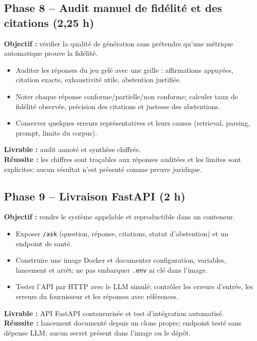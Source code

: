 \documentclass[11pt,a4paper]{article}
\begin{document}
\subsection*{Phase 8 -- Audit manuel de fidélité et des citations (2,25 h)}
\textbf{Objectif :} vérifier la qualité de génération sans prétendre qu'une métrique automatique prouve la fidélité.
\begin{itemize}
  \item Auditer les réponses du jeu gelé avec une grille : affirmations appuyées, citation exacte, exhaustivité utile, abstention justifiée.
  \item Noter chaque réponse conforme/partielle/non conforme; calculer taux de fidélité observée, précision des citations et justesse des abstentions.
  \item Conserver quelques erreurs représentatives et leurs causes (retrieval, parsing, prompt, limite du corpus).
\end{itemize}
\textbf{Livrable :} audit annoté et synthèse chiffrée.\\
\textbf{Réussite :} les chiffres sont traçables aux réponses auditées et les limites sont explicites; aucun résultat n'est présenté comme preuve juridique.

\subsection*{Phase 9 -- Livraison FastAPI (2 h)}
\textbf{Objectif :} rendre le système appelable et reproductible dans un conteneur.
\begin{itemize}
  \item Exposer \texttt{/ask} (question, réponse, citations, statut d'abstention) et un endpoint de santé.
  \item Construire une image Docker et documenter configuration, variables, lancement et arrêt; ne pas embarquer \texttt{.env} ni clé dans l'image.
  \item Tester l'API par HTTP avec le LLM simulé; contrôler les erreurs d'entrée, les erreurs du fournisseur et les réponses avec références.
\end{itemize}
\textbf{Livrable :} API FastAPI conteneurisée et test d'intégration automatisé.\\
\textbf{Réussite :} lancement documenté depuis un clone propre; endpoint testé sans dépense LLM; aucun secret présent dans l'image ou le dépôt.
\end{document}
